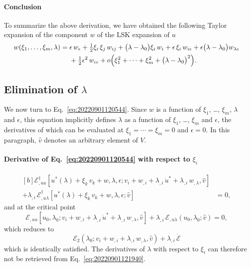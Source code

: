\documentclass[12pt, final]{scrartcl}
\theoremstyle{definition}
\newcommand{\E}{\mathcal E}
\newcommand{\EE}{\mathcal E ^ \dagger}
\begin{document}
\paragraph{Conclusion} To summarize the above derivation, we have obtained the following Taylor expansion of the
component $w$ of the LSK expansion of $u$
\begin{equation}
  \begin{aligned}[b]
    w(\xi_1, \ldots, \xi_m, \lambda) ={}& \epsilon \, w_\epsilon + \tfrac{1}{2} \xi_i \, \xi_j \, w_{ij} + \bigl( \lambda - \lambda_0 \bigr) \xi_i \, w_i + \epsilon \, \xi_i \, w_{i\epsilon} + \epsilon \bigl( \lambda - \lambda_0\bigr) w_{\lambda\epsilon}\\
    &+ \tfrac{1}{2} \epsilon^2 \, w_{\epsilon\epsilon} + o\Bigl(\xi_1^2 + \cdots + \xi_m^2 + \bigl(\lambda - \lambda_0\bigr)^2\Bigr).
  \end{aligned}
\end{equation}

\subsection{Elimination of \(λ\)}
\label{sec:20221020140252}

We now turn to Eq.~\eqref{eq:20220901120544}. Since $w$ is a function of \(\xi_1\), \dots, \(\xi_m\), \(\lambda\) and
\(\epsilon\), this equation implicitly defines $\lambda$ as a function of \(\xi_1\), \dots, \(\xi_m\) and \(\epsilon\), the derivatives of which
can be evaluated at $\xi_1 = \cdots = \xi_m = 0$ and \(\epsilon = 0\). In this paragraph, $\hat{v}$ denotes an arbitrary element of $V$.

\paragraph{Derivative of Eq.~\eqref{eq:20220901120544} with respect to \(\xi_i\)}
\begin{equation}
  \label{eq:20220901121940}
  \begin{aligned}[b]
    \EE_{,uu}[u^\ast(\lambda) + \xi_k \, v_k + w, \lambda, \epsilon; v_i + w_{,i} + \lambda_{,i} \, \dot{u}^\ast + \lambda_{,i} \, w_{,\lambda}, \hat{v}] &\\
    + \lambda_{, i} \, \EE_{,u\lambda}[u^\ast(\lambda) + \xi_k \, v_k + w, \lambda, \epsilon; \hat{v}] &= 0,
  \end{aligned}
\end{equation}
and at the critical point
\begin{equation}
  \E_{,uu}[u_0, λ_0; v_i + w_{,i} + \lambda_{,i} \, \dot{u}^\ast + \lambda_{,i} \, w_{,\lambda}, \hat{v}] + \lambda_{, i} \, \E_{,u\lambda}(u_0, \lambda_0; \hat{v}) = 0,
\end{equation}
which reduces to
\begin{equation}
  \E_2(\lambda_0; v_i + w_{,i} + \lambda_{,i} \, w_{,\lambda}, \hat{v}) + \lambda_{,i} \, \dot{\E}
\end{equation}
which is identically satisfied. The derivatives of \(\lambda\) with respect to \(\xi_i\) can therefore not be retrieved from
Eq.~\eqref{eq:20220901121940}.
\end{document}
